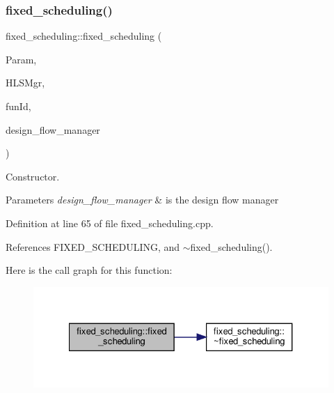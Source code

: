 \subsubsection{\texorpdfstring{fixed\+\_\+scheduling()}{fixed\_scheduling()}}
{\footnotesize\ttfamily fixed\+\_\+scheduling\+::fixed\+\_\+scheduling (\begin{DoxyParamCaption}\item[{const \hyperlink{Parameter_8hpp_a37841774a6fcb479b597fdf8955eb4ea}{Parameter\+Const\+Ref}}]{Param,  }\item[{const \hyperlink{hls__manager_8hpp_acd3842b8589fe52c08fc0b2fcc813bfe}{H\+L\+S\+\_\+manager\+Ref}}]{H\+L\+S\+Mgr,  }\item[{unsigned int}]{fun\+Id,  }\item[{const Design\+Flow\+Manager\+Const\+Ref}]{design\+\_\+flow\+\_\+manager }\end{DoxyParamCaption})}



Constructor. 


\begin{DoxyParams}{Parameters}
{\em design\+\_\+flow\+\_\+manager} & is the design flow manager \\
\hline
\end{DoxyParams}


Definition at line 65 of file fixed\+\_\+scheduling.\+cpp.



References F\+I\+X\+E\+D\+\_\+\+S\+C\+H\+E\+D\+U\+L\+I\+NG, and $\sim$fixed\+\_\+scheduling().

Here is the call graph for this function\+:
\nopagebreak
\begin{figure}[H]
\begin{center}
\leavevmode
\includegraphics[width=327pt]{d2/d79/classfixed__scheduling_a1b87a754455b7f0628760539923a3405_cgraph}
\end{center}
\end{figure}
\mbox{\label{classfixed__scheduling_a05b14aa177b8fb7def29ea848de939d8}} 
